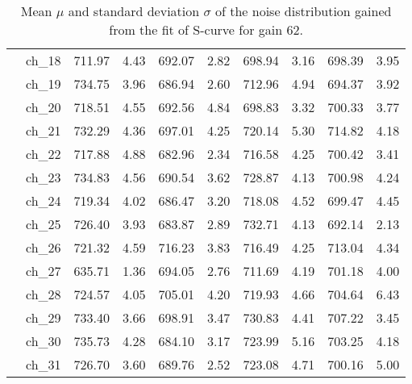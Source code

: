 \begin{table}[H]
{\begin{tabular}{|c|c|c|c|c|c|c|c|c|c|}
    &ch\_18 & 711.97 & 4.43 & 692.07 & 2.82 & 698.94 & 3.16 & 698.39 & 3.95 \\
    &ch\_19 & 734.75 & 3.96 & 686.94 & 2.60 & 712.96 & 4.94 & 694.37 & 3.92 \\
    &ch\_20 & 718.51 & 4.55 & 692.56 & 4.84 & 698.83 & 3.32 & 700.33 & 3.77 \\
    &ch\_21 & 732.29 & 4.36 & 697.01 & 4.25 & 720.14 & 5.30 & 714.82 & 4.18 \\
    &ch\_22 & 717.88 & 4.88 & 682.96 & 2.34 & 716.58 & 4.25 & 700.42 & 3.41 \\
    &ch\_23 & 734.83 & 4.56 & 690.54 & 3.62 & 728.87 & 4.13 & 700.98 & 4.24 \\
    &ch\_24 & 719.34 & 4.02 & 686.47 & 3.20 & 718.08 & 4.52 & 699.47 & 4.45 \\
    &ch\_25 & 726.40 & 3.93 & 683.87 & 2.89 & 732.71 & 4.13 & 692.14 & 2.13 \\
    &ch\_26 & 721.32 & 4.59 & 716.23 & 3.83 & 716.49 & 4.25 & 713.04 & 4.34 \\
    &ch\_27 & 635.71 & 1.36 & 694.05 & 2.76 & 711.69 & 4.19 & 701.18 & 4.00 \\
    &ch\_28 & 724.57 & 4.05 & 705.01 & 4.20 & 719.93 & 4.66 & 704.64 & 6.43 \\
    &ch\_29 & 733.40 & 3.66 & 698.91 & 3.47 & 730.83 & 4.41 & 707.22 & 3.45 \\
    &ch\_30 & 735.73 & 4.28 & 684.10 & 3.17 & 723.99 & 5.16 & 703.25 & 4.18 \\
    &ch\_31 & 726.70 & 3.60 & 689.76 & 2.52 & 723.08 & 4.71 & 700.16 & 5.00 \\
        
    \hline
        
    \end{tabular}
    }
    \caption{Mean $\mu$ and standard deviation $\sigma$ of the noise distribution gained from the fit of S-curve for gain 62.}
    \label{tab:noise_parameter_3}
\end{table}

